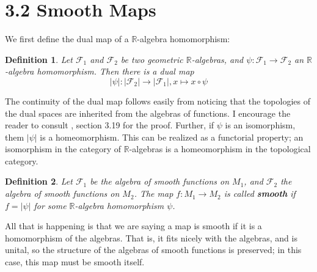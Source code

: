 \documentclass[12pt]{extarticle}
\newcommand\Reals{{\mathbb{R}}}
\newcommand{\ff}{\mathcal{F}}
\newtheorem{definition}{Definition}
\begin{document}
\section*{3.2 Smooth Maps}
We first define the dual map of a $\Reals$-algebra homomorphism:
\begin{definition}
Let $\ff_1$ and $\ff_2$ be two geometric $\Reals$-algebras, and $\psi:\ff_1\to\ff_2$ an $\Reals$-algebra homomorphism. Then there is a dual map
\begin{equation}
|\psi|:|\ff_2|\to|\ff_1|, x\mapsto x\circ\psi
\end{equation}
\end{definition}
The continuity of the dual map follows easily from noticing that the topologies of the dual spaces are inherited from the algebras of functions. I encourage the reader to consult \cite{nestruev}, section 3.19 for the proof. Further, if $\psi$ is an isomorphism, them $|\psi|$ is a homeomorphism. This can be realized as a functorial property; an isomorphism in the category of $\Reals$-algebras is a homeomorphism in the topological category.
\begin{definition}
Let $\ff_1$ be the algebra of smooth functions on $M_1$, and $\ff_2$ the algebra of smooth functions on $M_2$. The map $f:M_1\to M_2$ is called \textbf{smooth} if $f=|\psi|$ for some $\Reals$-algebra homomorphism $\psi$.
\end{definition}
All that is happening is that we are saying a map is smooth if it is a homomorphism of the algebras. That is, it fits nicely with the algebras, and is unital, so the structure of the algebras of smooth functions is preserved; in this case, this map must be smooth itself.
\end{document}
